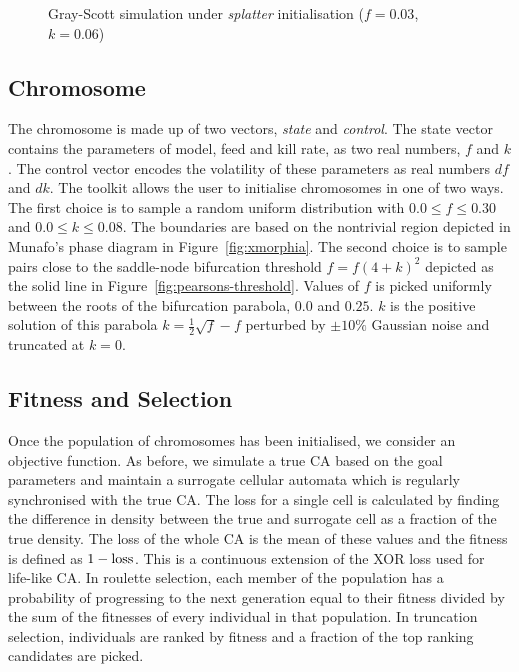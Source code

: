 \begin{figure}[!h]
            \hfill
            \caption{Gray-Scott simulation under \textit{splatter} initialisation ($f = 0.03$, $k = 0.06$)}
\label{fig:splatter}
\end{figure}

\subsection{Chromosome}
The chromosome is made up of two vectors, \textit{state} and \textit{control}. The state vector contains the parameters of model, feed and kill rate, as two real numbers, $f$ and $k$. The control vector encodes the volatility of these parameters as real numbers $df$ and $dk$. The toolkit allows the user to initialise chromosomes in one of two ways. The first choice is to sample a random uniform distribution with $0.0 \leq f \leq 0.30$ and $0.0 \leq k \leq 0.08$. The boundaries are based on the nontrivial region depicted in Munafo's phase diagram in Figure~\ref{fig:xmorphia}. The second choice is to sample pairs close to the saddle-node bifurcation threshold $f = f(4+k)^2$ depicted as the solid line in Figure~\ref{fig:pearsons-threshold}. Values of $f$ is picked uniformly between the roots of the bifurcation parabola, $0.0$ and $0.25$. $k$ is the positive solution of this parabola $k = \frac{1}{2}\sqrt{f} - f$ perturbed by $\pm 10\%$ Gaussian noise and truncated at $k = 0$.

\subsection{Fitness and Selection}
Once the population of chromosomes has been initialised, we consider an objective function. As before, we simulate a true CA based on the goal parameters and maintain a surrogate cellular automata which is regularly synchronised with the true CA. The loss for a single cell is calculated by finding the difference in density between the true and surrogate cell as a fraction of the true density. The loss of the whole CA is the mean of these values and the fitness is defined as $1 - \textnormal{loss}$. This is a continuous extension of the XOR loss used for life-like CA. In roulette selection, each member of the population has a probability of progressing to the next generation equal to their fitness divided by the sum of the fitnesses of every individual in that population. In truncation selection, individuals are ranked by fitness and a fraction of the top ranking candidates are picked.\\

